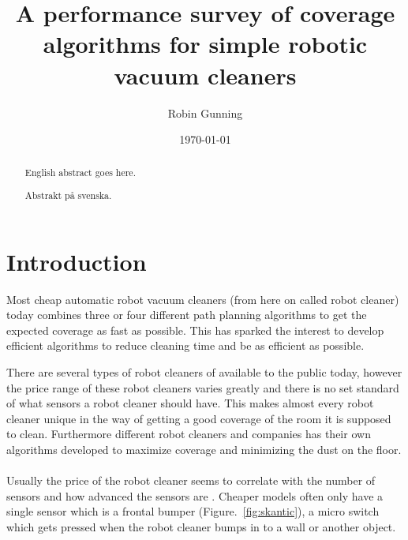 \documentclass[bachelor]{kththesis}
\title{A performance survey of coverage algorithms for simple robotic vacuum cleaners}
\author{Robin Gunning}
\date{\today}
\begin{document}
\frontmatter

\titlepage

\begin{abstract}
  English abstract goes here.
\end{abstract}


\begin{otherlanguage}{swedish}
  \begin{abstract}
    Abstrakt på svenska.
  \end{abstract}
\end{otherlanguage}


\tableofcontents


\mainmatter


\chapter{Introduction}

Most cheap automatic robot vacuum cleaners (from here on called robot cleaner) today combines three 
or four different path planning algorithms to get the expected coverage as fast as possible. This 
has sparked the interest to develop efficient algorithms to reduce cleaning time and be as efficient 
as possible.
  
There are several types of robot cleaners of available to the public today, however the price range 
of these robot cleaners varies greatly and there is no set standard of what sensors a robot cleaner 
should have. This makes almost every robot cleaner unique in the way of getting a good coverage of 
the room it is supposed to clean. Furthermore different robot cleaners and companies has their own 
algorithms developed to maximize coverage and minimizing the dust on the floor. 
\\\\
Usually the price of the robot cleaner seems to correlate with the number of sensors and how 
advanced the sensors are \parencite{irobot}. Cheaper models often only have a single sensor which 
is a frontal bumper (Figure.~\ref{fig:skantic}), a micro switch which gets pressed when the robot cleaner bumps in to a 
wall or another object. 
\end{document}
